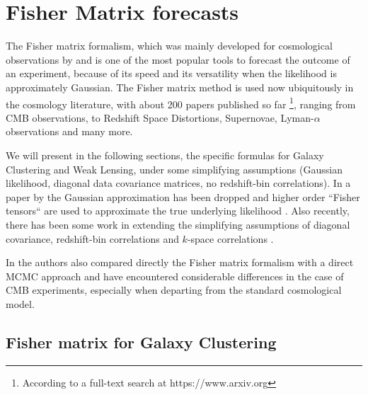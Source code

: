 \section{\label{sec:Fisher-Matrix-forecasts}Fisher Matrix forecasts}

The Fisher matrix formalism, which was mainly developed for cosmological observations by
\cite{tegmark_measuring_1998} and \cite{seo_baryonic_2005}
is one of the most popular tools to forecast the outcome of an experiment,
because of its speed and its versatility when the likelihood is approximately
Gaussian. 
The Fisher matrix method is used now ubiquitously in the cosmology literature, 
with about 200 papers published so far \footnote{According to a full-text search at https://www.arxiv.org}, ranging from CMB observations,
to Redshift Space Distortions, Supernovae, Lyman-$\alpha$ observations and many more.

We will present in the following sections, the specific formulas for Galaxy Clustering 
and Weak Lensing, under some simplifying assumptions (Gaussian likelihood,
diagonal data covariance matrices, no redshift-bin correlations).
In a paper by \cite{sellentin_breaking_2014} the Gaussian approximation has been 
dropped and higher order ``Fisher tensors`` are used to approximate the true underlying likelihood \cite{cite Sellentin more}.
Also recently, there has been some work in extending the simplifying assumptions of 
diagonal covariance, redshift-bin correlations and $k$-space correlations \cite{bailoni_improving_2016, Durrer, 
Amendola with Blot}.

In \cite{Khedekar, Majumdar} the authors also compared directly the Fisher matrix formalism with a direct MCMC approach
and have encountered considerable differences in the case of CMB experiments,
especially when departing from the standard cosmological model.


\subsection{Fisher matrix for Galaxy Clustering\label{sub:Fisher-Galaxy-Clustering}}

